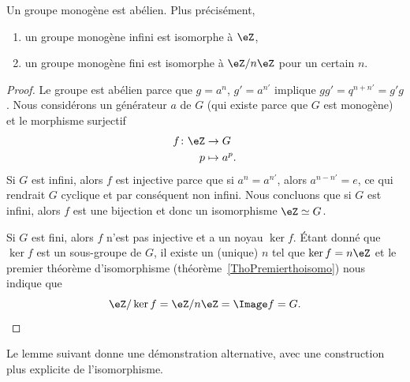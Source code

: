 \begin{theorem}     \label{THOooDOMZooOEYHAe}
    Un groupe monogène est abélien. Plus précisément,
    \begin{enumerate}
        \item
            un groupe monogène infini est isomorphe à \( \eZ\),
        \item
            un groupe monogène fini est isomorphe à \( \eZ/n\eZ\) pour un certain \( n\).
    \end{enumerate}
\end{theorem}

\begin{proof}
    Le groupe est abélien parce que $g=a^n$, \( g'=a^{n'}\) implique \( gg'=q^{n+n'}=g'g\). Nous considérons un générateur \( a\) de \( G\) (qui existe parce que $G$ est monogène) et le morphisme surjectif
    \begin{equation}
        \begin{aligned}
            f\colon \eZ&\to G \\
            p&\mapsto a^p.
        \end{aligned}
    \end{equation}
    Si \( G\) est infini, alors \( f\) est injective parce que si \( a^n=a^{n'}\), alors \( a^{n-n'}=e\), ce qui rendrait \( G\) cyclique et par conséquent non infini. Nous concluons que si \( G\) est infini, alors \( f\) est une bijection et donc un isomorphisme \( \eZ\simeq G\).

    Si \( G\) est fini, alors \( f\) n'est pas injective et a un noyau \( \ker f\). Étant donné que \( \ker f\) est un sous-groupe de \( G\), il existe un (unique) \( n\) tel que \( \ker f=n\eZ\) et le premier théorème d'isomorphisme (théorème~\ref{ThoPremierthoisomo}) nous indique que
    \begin{equation}
        \eZ/\ker f=\eZ/n\eZ=\Image f=G.
    \end{equation}

\end{proof}

Le lemme suivant donne une démonstration alternative, avec une construction plus explicite de l'isomorphisme.

